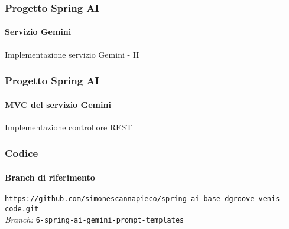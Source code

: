 %
\begin{frame}[t,fragile] \frametitle{Progetto Spring AI}
    \framesubtitle{Servizio Gemini}
        \begin{block}{Implementazione servizio Gemini - II}
            {\tiny}
    \end{block}
\end{frame}
%
\begin{frame}[t,fragile] \frametitle{Progetto Spring AI}
    \framesubtitle{MVC del servizio Gemini}
    	\vspace*{-.7cm}
        \begin{block}{Implementazione controllore REST}
			{\tiny}
    	\end{block}
\end{frame}
%
\begin{frame}[fragile] \frametitle{Codice}
    \framesubtitle{Branch di riferimento}
	\begin{center}
		{\scriptsize \href{https://github.com/simonescannapieco/spring-ai-base-dgroove-venis-code.git}{\texttt{https://github.com/simonescannapieco/spring-ai-base-dgroove-venis-code.git}}}\\
		\textit{Branch:} \alert{\texttt{6-spring-ai-gemini-prompt-templates}}
	\end{center}
\end{frame}